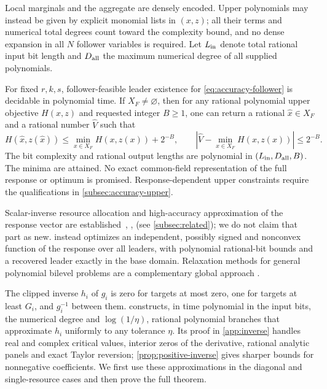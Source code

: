 Local marginals and the aggregate are densely encoded. Upper polynomials
may instead be given by explicit monomial lists in $(x,z)$; all their
terms and numerical total degrees count toward the complexity bound,
and no dense expansion in all $N$ follower variables is required.
Let $L_{\rm in}$ denote total rational input bit length and $D_{\rm all}$
the maximum numerical degree of all supplied polynomials.

\begin{theorem}\label{thm:accuracy-global}
For fixed $r,k,s$, follower-feasible leader existence for
\eqref{eq:accuracy-follower} is decidable in polynomial time. If
$X_F\ne\varnothing$, then for any rational polynomial upper objective
$H(x,z)$ and requested integer $B\ge1$, one can return a rational
$\widehat x\in X_F$ and a rational number $\widehat V$ such that
\[
 H(\widehat x,z(\widehat x))\le
       \min_{x\in X_F}H(x,z(x))+2^{-B},\qquad
 |\widehat V-\min_{x\in X_F}H(x,z(x))|\le2^{-B}.
\]
The bit complexity and rational output lengths are polynomial in
$(L_{\rm in},D_{\rm all},B)$. The minima are attained. No exact
common-field representation of the full response or optimum is promised.
Response-dependent upper constraints require the qualifications in
\cref{subsec:accuracy-upper}.
\end{theorem}

Scalar-inverse resource allocation and high-accuracy approximation of the
response vector are established~\cite{PatrikssonStromberg2015},
\cite[Sections 1.2--1.3 and Theorem 1.1]{HochbaumShanthikumar1990},
\cite{Vigneron2014} (see \cref{subsec:related}); we do not claim that part
as new.
 instead
optimizes an independent, possibly signed and nonconvex function of the
response over all leaders, with polynomial rational-bit bounds and a
recovered leader exactly in the base domain. Relaxation methods for general polynomial bilevel problems are a
complementary global approach \cite{JeyakumarEtAl2016}.

The clipped inverse $h_i$ of $g_i$ is zero for targets at most zero,
one for targets at least $G_i$, and $g_i^{-1}$ between them.
 constructs, in time polynomial in the
input bits, the numerical degree and $\log(1/\eta)$, rational polynomial
branches that approximate $h_i$ uniformly to any tolerance $\eta$. Its proof in \cref{app:inverse} handles real and
complex critical values, interior zeros of the derivative, rational
analytic panels and exact Taylor reversion; \cref{prop:positive-inverse}
gives sharper bounds for nonnegative coefficients. We first use these
approximations in the diagonal and single-resource cases
and then prove the full theorem.

